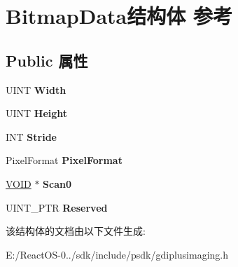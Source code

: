 \hypertarget{struct_bitmap_data}{}\section{Bitmap\+Data结构体 参考}
\label{struct_bitmap_data}
\subsection*{Public 属性}
\begin{DoxyCompactItemize}
\item 
\mbox{\label{struct_bitmap_data_adb7049876c64416100b1fa0db2d9fcc8}} 
U\+I\+NT {\bfseries Width}
\item 
\mbox{\label{struct_bitmap_data_aab12908727f88346ad9973461f8acfee}} 
U\+I\+NT {\bfseries Height}
\item 
\mbox{\label{struct_bitmap_data_a1eb9bc7375d474b40d827765e5742171}} 
I\+NT {\bfseries Stride}
\item 
\mbox{\label{struct_bitmap_data_a3fdd255d5f9bd868cd04a754d632fe2f}} 
Pixel\+Format {\bfseries Pixel\+Format}
\item 
\mbox{\label{struct_bitmap_data_acc031f8c133d5fcacf304318754d001c}} 
\hyperlink{interfacevoid}{V\+O\+ID} $\ast$ {\bfseries Scan0}
\item 
\mbox{\label{struct_bitmap_data_a1378425e3dd194a20ee4f4973553f7f2}} 
U\+I\+N\+T\+\_\+\+P\+TR {\bfseries Reserved}
\end{DoxyCompactItemize}


该结构体的文档由以下文件生成\+:\begin{DoxyCompactItemize}
\item 
E\+:/\+React\+O\+S-\/0../sdk/include/psdk/gdiplusimaging.\+h\end{DoxyCompactItemize}
